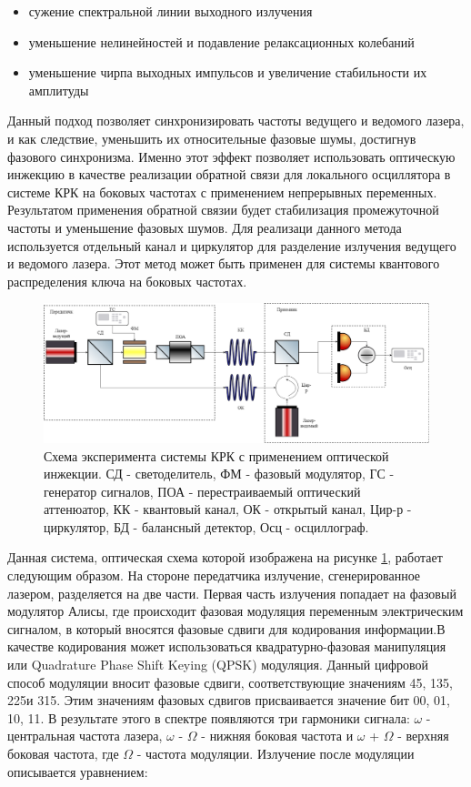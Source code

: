 \begin{itemize}
    \item сужение спектральной линии выходного излучения
    \item уменьшение нелинейностей и подавление релаксационных колебаний
    \item уменьшение чирпа выходных импульсов и увеличение стабильности их амплитуды
\end{itemize}
Данный подход позволяет синхронизировать частоты ведущего и ведомого лазера, и как следствие, уменьшить их относительные фазовые шумы, достигнув фазового синхронизма. Именно этот эффект позволяет использовать оптическую инжекцию в качестве реализации обратной связи для локального осциллятора в системе КРК на боковых частотах с применением непрерывных переменных. Результатом применения обратной связии будет стабилизация промежуточной частоты и уменьшение фазовых шумов. Для реализаци данного метода используется отдельный канал и циркулятор для разделение излучения ведущего и ведомого лазера. 
Этот метод может быть применен для системы квантового распределения ключа на боковых частотах.
\begin{figure}
    \centering
    \includegraphics[width=\textwidth]{images/Схема с обратной связью.png}
    \caption{Схема эксперимента системы КРК с применением оптической инжекции. СД - светоделитель, ФМ - фазовый модулятор, ГС - генератор сигналов, ПОА - перестраиваемый оптический аттенюатор, КК - квантовый канал, ОК - открытый канал, Цир-р - циркулятор, БД - балансный детектор, Осц - осциллограф.}
    \label{fig:opt inj scheme}
\end{figure}
Данная система, оптическая схема которой изображена на рисунке \ref{fig:opt inj scheme}, работает следующим образом. На стороне передатчика излучение, сгенерированное лазером, разделяется на две части. Первая часть излучения попадает на фазовый модулятор Алисы, где происходит фазовая модуляция переменным электрическим сигналом, в который вносятся фазовые сдвиги для кодирования информации.В качестве кодирования может использоваться квадратурно-фазовая манипуляция или Quadrature Phase Shift Keying (QPSK) модуляция. Данный цифровой способ модуляции вносит фазовые сдвиги, соответствующие значениям 45\textdegree, 135\textdegree, 225\textdegree и 315\textdegree. Этим значениям фазовых сдвигов присваивается значение бит {00, 01, 10, 11}. В результате этого в спектре появляются три гармоники сигнала: $\omega$ - центральная частота лазера, $\omega$ - $\Omega$ - нижняя боковая частота  и $\omega$ + $\Omega$ - верхняя боковая частота, где $\Omega$ - частота модуляции. Излучение после модуляции описывается уравнением: 
